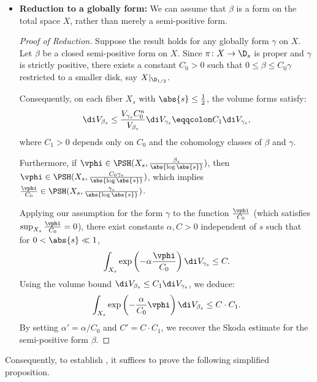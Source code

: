 \documentclass[12pt]{amsart}
\begin{document}
\begin{itemize}
    \item \textbf{Reduction to a globally \Kahler form:} We can assume that $\beta$ is a \Kahler form on the total space $X$, rather than merely a semi-positive form.

    \begin{proof}[Proof of Reduction]
        Suppose the result holds for any globally \Kahler form $\gamma$ on $X$. Let $\beta$ be a closed semi-positive form on $X$. Since $\pi \colon X \to \D_s$ is proper and $\gamma$ is strictly positive, there exists a constant $C_0 > 0$ such that $0 \leq \beta \leq C_0 \gamma$ restricted to a smaller disk, say $X|_{\D_{1/2}}$.

        Consequently, on each fiber $X_s$ with $\abs{s} \leq \frac{1}{2}$, the volume forms satisfy:
        \[
        \di V_{\beta_s} \leq \frac{V_{\gamma_s} C_0^n}{V_{\beta_s}} \di V_{\gamma_s} \eqqcolon C_1 \di V_{\gamma_s},
        \]
        where $C_1 > 0$ depends only on $C_0$ and the cohomology classes of $\beta$ and $\gamma$.

        Furthermore, if $\vphi \in \PSH(X_s, \frac{\beta_s}{\abs{\log \abs{s}}})$, then $\vphi \in \PSH(X_s, \frac{C_0\gamma_s}{\abs{\log \abs{s}}})$, which implies $\frac{\vphi}{C_0} \in \PSH(X_s, \frac{\gamma_s}{\abs{\log \abs{s}}})$.

        Applying our assumption for the \Kahler form $\gamma$ to the function $\frac{\vphi}{C_0}$ (which satisfies $\sup_{X_s} \frac{\vphi}{C_0} = 0$), there exist constants $\alpha, C > 0$ independent of $s$ such that for $0 < \abs{s} \ll 1$,
        \[
        \int_{X_s} \exp\left(-\alpha \frac{\vphi}{C_0}\right) \di V_{\gamma_s} \leq C.
        \]
        Using the volume bound $\di V_{\beta_s} \leq C_1 \di V_{\gamma_s}$, we deduce:
        \[
        \int_{X_s} \exp\left(- \frac{\alpha}{C_0}\vphi\right) \di V_{\beta_s} \leq C \cdot C_1.
        \]
        By setting $\alpha' = \alpha / C_0$ and $C' = C \cdot C_1$, we recover the Skoda estimate for the semi-positive form $\beta$.
    \end{proof}
\end{itemize}

Consequently, to establish , it suffices to prove the following simplified proposition.
\end{document}
